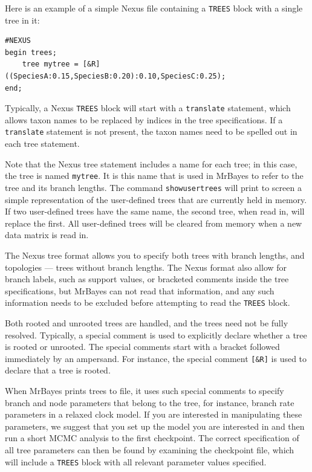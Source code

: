 \documentclass[12pt]{book}
\begin{document}
Here is an example of a simple Nexus file containing a \texttt{TREES} block with a single tree in
it:

\begin{Verbatim}
#NEXUS
begin trees;
    tree mytree = [&R] ((SpeciesA:0.15,SpeciesB:0.20):0.10,SpeciesC:0.25);
end;
\end{Verbatim}

Typically, a Nexus \texttt{TREES} block will start with a \texttt{translate} statement, which
allows taxon names to be replaced by indices in the tree specifications. If a \texttt{translate}
statement is not present, the taxon names need to be spelled out in each tree statement.

Note that the Nexus tree statement includes a name for each tree; in this case, the tree is named
\texttt{mytree}. It is this name that is used in MrBayes to refer to the tree and its branch
lengths.  The command \texttt{showusertrees} will print to screen a simple representation of the
user-defined trees that are currently held in memory. If two user-defined trees have the same name,
the second tree, when read in, will replace the first. All user-defined trees will be cleared from
memory when a new data matrix is read in.

The Nexus tree format allows you to specify both trees with branch lengths, and topologies ---
trees without branch lengths. The Nexus format also allow for branch labels, such as support
values, or bracketed comments inside the tree specifications, but MrBayes can not read that
information, and any such information needs to be excluded before attempting to read the
\texttt{TREES} block.

Both rooted and unrooted trees are handled, and the trees need not be fully resolved. Typically, a
special comment is used to explicitly declare whether a tree is rooted or unrooted. The special
comments start with a bracket followed immediately by an ampersand. For instance, the special
comment \texttt{[\&R]} is used to declare that a tree is rooted.

When MrBayes prints trees to file, it uses such special comments to specify branch and node
parameters that belong to the tree, for instance, branch rate parameters in a relaxed clock model.
If you are interested in manipulating these parameters, we suggest that you set up the model you
are interested in and then run a short MCMC analysis to the first checkpoint. The correct
specification of all tree parameters can then be found by examining the checkpoint file, which will
include a \texttt{TREES} block with all relevant parameter values specified.
\end{document}
